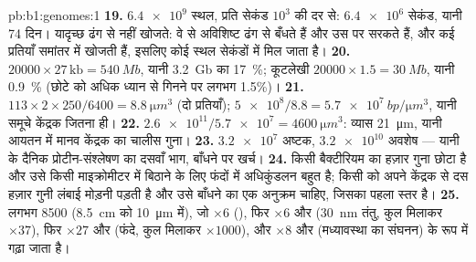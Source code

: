 \begin{solution}{pb:b1:genomes:1}
\textbf{19.} $\num{6.4e9}$ स्थल, प्रति सेकंड $10^3$ की दर से:
$\num{6.4e6}$ सेकंड, यानी 74 दिन।  यादृच्छ ढंग से नहीं खोजते: वे
 से अविशिष्ट ढंग से बँधते हैं और उस पर सरकते हैं, और कई प्रतियाँ
समांतर में खोजती हैं, इसलिए कोई स्थल सेकंडों में मिल जाता है।
\textbf{20.} $\num{20000}\times 27\,\mathrm{kb} = \qty{540}{Mb}$, यानी
\qty{3.2}{Gb} का \qty{17}{\%}; कूटलेखी $\num{20000}\times 1.5 =
\qty{30}{Mb}$, यानी \qty{0.9}{\%} (छोटे  को अधिक ध्यान से गिनने पर
लगभग 1.5\%)।
\textbf{21.} $113\times 2\times 250/6400 = \qty{8.8}{\micro m^3}$ (दो
प्रतियाँ); $\num{5e8}/8.8 = \qty{5.7e7}{bp/\micro m^3}$, यानी समूचे
केंद्रक जितना ही।
\textbf{22.} $\num{2.6e11}/\num{5.7e7} = \qty{4600}{\micro m^3}$:
व्यास \qty{21}{\micro m}, यानी आयतन में मानव केंद्रक का चालीस गुना।
\textbf{23.} $\num{3.2e7}$ अष्टक, $\num{3.2e10}$ अवशेष --- यानी
 के दैनिक प्रोटीन-संश्लेषण का दसवाँ भाग, बाँधने पर खर्च।
\textbf{24.} किसी बैक्टीरियम का  हज़ार गुना छोटा है और उसे किसी
माइक्रोमीटर में बिठाने के लिए फंदों में अधिकुंडलन बहुत है; किसी
 को अपने केंद्रक से दस हज़ार गुनी लंबाई मोड़नी पड़ती है और उसे
बाँधने का एक अनुक्रम चाहिए, जिसका पहला स्तर  है।
\textbf{25.} लगभग \num{8500} (\qty{8.5}{cm} को \qty{10}{\micro m} में),
जो $\times 6$ (), फिर $\times 6$ और (\qty{30}{nm} तंतु,
कुल मिलाकर $\times 37$), फिर $\times 27$ और (फंदे, कुल मिलाकर $\times 1000$), और
$\times 8$ और (मध्यावस्था का संघनन) के रूप में गढ़ा जाता है।
\end{solution}
